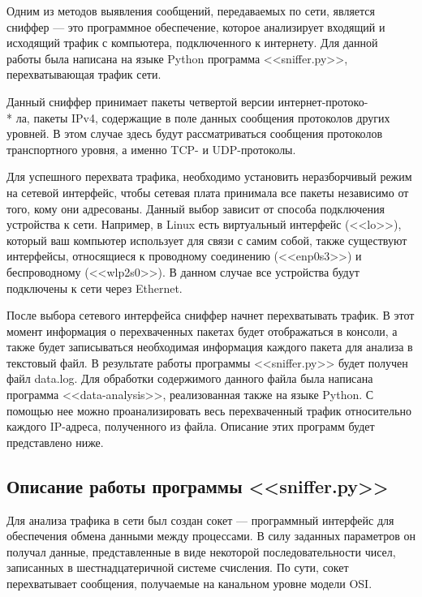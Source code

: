 \documentclass[bachelor, och, coursework]{SCWorks}
\begin{document}
  Одним из методов выявления сообщений, передаваемых по сети, является сниффер --- это программное обеспечение, которое анализирует входящий
  и исходящий трафик с компьютера, подключенного к интернету. Для данной работы была написана на языке Python программа <<sniffer.py>>, перехватывающая
  трафик сети.
    
  Данный сниффер принимает пакеты четвертой версии интернет-протоко- \\* ла, пакеты IPv4, содержащие в поле данных сообщения протоколов
  других уровней. В этом случае здесь будут рассматриваться сообщения протоколов транспортного уровня, а именно TCP- и UDP-протоколы.
    
  Для успешного перехвата трафика, необходимо установить неразборчивый режим на сетевой интерфейс, чтобы сетевая плата принимала
  все пакеты независимо от того, кому они адресованы. Данный выбор зависит от способа подключения устройства к сети. Например, в Linux
  есть виртуальный интерфейс (<<lo>>), который ваш компьютер использует для связи с самим собой, также существуют интерфейсы, относящиеся
  к проводному соединению (<<enp0s3>>) и беспроводному (<<wlp2s0>>). В данном случае все устройства будут подключены к сети через Ethernet.
  
  После выбора сетевого интерфейса сниффер начнет перехватывать трафик. В этот момент информация о перехваченных пакетах будет отображаться
  в консоли, а также будет записываться необходимая информация каждого пакета для анализа в текстовый файл.
  В результате работы программы <<sniffer.py>> будет получен файл data.log. Для обработки содержимого данного файла была написана программа
  <<data-analysis>>, реализованная также на языке Python. С помощью нее можно проанализировать весь перехваченный трафик относительно каждого
  IP-адреса, полученного из файла. Описание этих программ будет представлено ниже. 

  \subsection{Описание работы программы <<sniffer.py>>}

    Для анализа трафика в сети был создан сокет --- программный интерфейс для обеспечения обмена данными между процессами. В силу заданных параметров он
    получал данные, представленные в виде некоторой последовательности чисел, записанных в шестнадцатеричной системе счисления. По сути, сокет перехватывает
    сообщения, получаемые на канальном уровне модели OSI.
    
\end{document}
